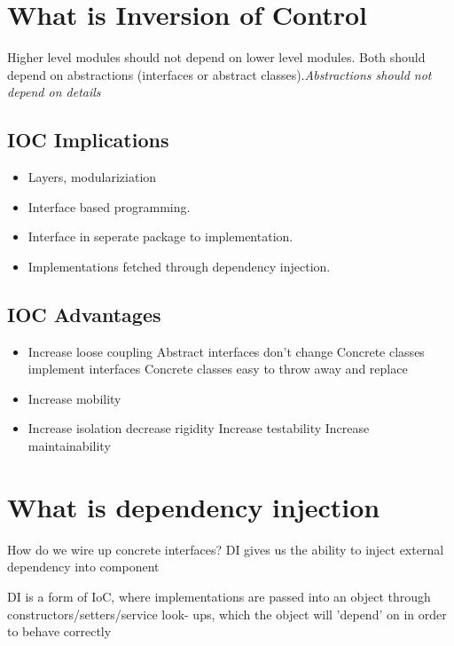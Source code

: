 \documentclass[a4paper,10pt]{scrreprt}
\begin{document}
\section{What is Inversion of Control}
Higher level modules should not depend on lower level modules. Both should depend on abstractions (interfaces or 
abstract classes).\textit{Abstractions should not depend on details}
\subsection{IOC Implications}
\begin{itemize}
 \item Layers, modulariziation
 \item Interface based programming.
 \item Interface in seperate package to implementation.
 \item Implementations fetched through dependency injection.
 
\end{itemize}
\subsection{IOC Advantages}
\begin{itemize}
 \item Increase loose coupling
\subitem  Abstract interfaces don't change
\subitem  Concrete classes implement interfaces
\subitem  Concrete classes easy to throw away and replace
\item Increase mobility
\item Increase isolation
\subitem  decrease rigidity
\subitem Increase testability
\subitem Increase maintainability
\end{itemize}

\section{What is dependency injection}
\begin{description}
 \item [Purpose] How do we wire up concrete interfaces? DI gives us the ability to inject external dependency into 
component
\item DI is a form of IoC, where implementations are passed
into an object through constructors/setters/service look-
ups, which the object will 'depend' on in order to behave
correctly
\end{description}
\end{document}
